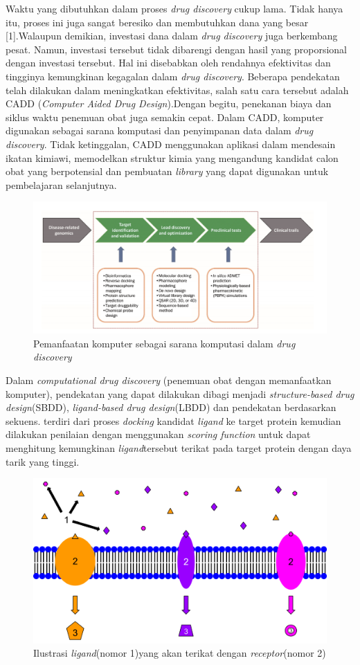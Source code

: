 Waktu yang dibutuhkan dalam proses \textit{drug discovery} cukup lama. Tidak hanya itu, proses ini juga sangat beresiko dan membutuhkan dana yang besar [1].Walaupun demikian, investasi dana dalam \textit{drug discovery} juga berkembang pesat. Namun, investasi tersebut tidak dibarengi dengan hasil yang proporsional dengan investasi tersebut. Hal ini disebabkan oleh rendahnya efektivitas dan tingginya kemungkinan kegagalan dalam \textit{drug discovery}. Beberapa pendekatan telah dilakukan dalam meningkatkan efektivitas, salah satu cara tersebut adalah CADD (\textit{Computer Aided Drug Design}).Dengan begitu, penekanan biaya dan siklus waktu penemuan obat juga semakin cepat. Dalam CADD, komputer digunakan sebagai sarana komputasi dan penyimpanan data dalam \textit{drug discovery}. Tidak ketinggalan, CADD menggunakan aplikasi dalam mendesain ikatan kimiawi, memodelkan struktur kimia yang mengandung kandidat calon obat yang berpotensial dan pembuatan \textit{library} yang dapat digunakan untuk pembelajaran selanjutnya.
\begin{figure}
	\centering
	\includegraphics [scale=0.4]{siklus_dd.png}
	\caption{Pemanfaatan komputer sebagai sarana komputasi dalam \textit{drug discovery}}
\end{figure}
Dalam \textit{computational drug discovery} (penemuan obat dengan memanfaatkan komputer), pendekatan yang dapat dilakukan dibagi menjadi \textit{structure-based drug design}(SBDD), \textit{ligand-based drug design}(LBDD) dan pendekatan berdasarkan sekuens.  terdiri dari proses \textit{docking} kandidat \textit{ligand} ke target protein kemudian dilakukan penilaian dengan menggunakan \textit{scoring function} untuk dapat menghitung kemungkinan \textit{ligand}tersebut terikat pada target protein dengan daya tarik yang tinggi. 
\begin{figure}
	\centering
	\includegraphics [scale=0.5]{receptor.png}
	\caption{Ilustrasi \textit{ligand}(nomor 1)yang akan terikat dengan \textit{receptor}(nomor 2)}
\end{figure}   
